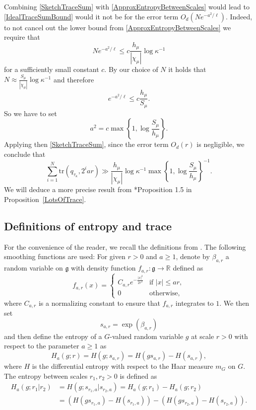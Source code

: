 \documentclass[10pt, english,oneside,reqno]{amsart}
\theoremstyle{plain}
\theoremstyle{remark}
\numberwithin{equation}{section}
\numberwithin{figure}{section}
\newcommand{\R}{\mathbb{R}}
\newcommand{\Haarof}[1]{m_{#1}}
\begin{document}
Combining \eqref{SketchTraceSum} with \eqref{ApproxEntropyBetweenScales} would lead to \eqref{IdealTraceSumBound} would it not be for the error term $O_{d}(Ne^{-a^2/\ell})$. Indeed, to not cancel out the lower bound from \eqref{ApproxEntropyBetweenScales} we require that $$Ne^{-a^2/\ell} \leq c \frac{h_{\mu}}{|\chi_{\mu}|} \log \kappa^{-1}$$ for a sufficiently small constant $c$. By our choice of $N$ it holds that $N \approx \frac{S_{\mu}}{|\chi_{\mu}|} \log \kappa^{-1}$ and therefore $$e^{-a^2/\ell} \leq c \frac{h_{\mu}}{S_{\mu}}.$$ So we have to set $$a^2 = c\max\left\{ 1,\log \frac{S_{\mu}}{h_{\mu}}  \right\}.$$ Applying then \eqref{SketchTraceSum}, since the error term $O_d(r)$ is negligible, we conclude that 
\begin{equation}\label{IntroLotsofTrace}
    \sum_{i = 1}^{N} \mathrm{tr}(q_{\tau_{\kappa}}, 2^i a r) \gg \frac{h_{\mu}}{|\chi_{\mu}|} \log \kappa^{-1} \max\left\{ 1,\log \frac{S_{\mu}}{h_{\mu}}  \right\}^{-1}.
\end{equation}
We will deduce a more precise result from \cite{KittleKoglerEntropy}*{Proposition 1.5} in Proposition~\ref{LotsOfTrace}.

\subsection{Definitions of entropy and trace}\label{section:vartrdef}

For the convenience of the reader, we recall the definitions from \cite{KittleKoglerEntropy}. The following smoothing functions are used: For given $r > 0$ and $a \geq 1$, denote by $\beta_{a,r}$ a random variable on $\mathfrak{g}$ with density function $f_{a,r}: \mathfrak{g} \to \R$ defined as $$f_{a,r}(x) = \begin{cases}
    C_{a,r}e^{-\frac{|x|^2}{2r^2}} & \text{if } |x| \leq ar, \\
    0 &\text{otherwise},
    \end{cases}$$ where $C_{a,r}$ is a normalizing constant to ensure that $f_{a,r}$ integrates to $1$. We then set 
    \begin{equation}\label{sardef}
        s_{a,r} = \exp(\beta_{a,r})
    \end{equation}
    and then define the entropy of a $G$-valued random variable $g$ at scale $r > 0$ with respect to the parameter $a \geq 1$ as 
    \begin{equation}\label{Hadef}
        H_a(g;r) = H(g; s_{a,r}) = H(gs_{a,r}) - H(s_{a,r}),
    \end{equation}
    where $H$ is the differential entropy with respect to the Haar measure $\Haarof{G}$ on $G$. The entropy between scales $r_1, r_2 > 0$ is defined as 
\begin{align*}\label{DefEntScales}
    H_a(g;r_1|r_2) &= H(g; s_{r_1,a}| s_{r_2,a}) = H_a(g;r_1) - H_a(g;r_2) \\ &= (H(gs_{r_1,a}) - H(s_{r_1,a})) - ( H(gs_{r_2,a}) - H(s_{r_2,a})).
\end{align*}
\end{document}
